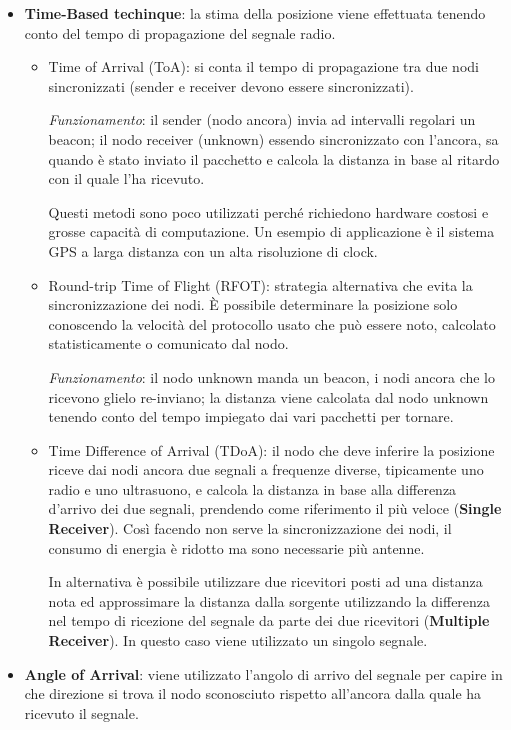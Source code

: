 \begin{itemize}
    \item \textbf{Time-Based techinque}: la stima della posizione viene effettuata tenendo conto
    del tempo di propagazione del segnale radio.
    \begin{itemize}
        \item Time of Arrival (ToA): si conta il tempo di propagazione tra due
        nodi sincronizzati (sender e receiver devono essere sincronizzati).

		\textit{Funzionamento}: il sender (nodo ancora) invia ad intervalli regolari un beacon; il nodo receiver (unknown) essendo sincronizzato con l'ancora, sa quando è stato inviato il pacchetto e calcola la distanza in base al ritardo con il quale l'ha ricevuto.

        Questi metodi sono poco utilizzati perché richiedono hardware costosi e grosse capacità
        di computazione. Un esempio di applicazione è il sistema GPS a larga distanza
        con un alta risoluzione di clock.

        \item Round-trip Time of Flight (RFOT): strategia alternativa che evita la
        sincronizzazione dei nodi. \`E possibile determinare la posizione solo conoscendo
        la velocità del protocollo usato che può essere noto, calcolato statisticamente
        o comunicato dal nodo.

        \textit{Funzionamento}: il nodo unknown manda un beacon, i nodi ancora che lo ricevono glielo re-inviano; la distanza viene calcolata dal nodo unknown tenendo conto del tempo impiegato dai vari pacchetti per tornare.

        \item Time Difference of Arrival (TDoA): il nodo che deve inferire la posizione riceve dai nodi ancora due segnali a frequenze diverse, tipicamente uno radio e uno ultrasuono, e calcola la distanza in base alla differenza d'arrivo dei due segnali, prendendo come riferimento il più veloce (\textbf{Single Receiver}).
        Così facendo non serve la sincronizzazione dei nodi, il consumo di
energia è ridotto ma sono necessarie più antenne.

        In alternativa è possibile utilizzare due ricevitori posti ad una distanza nota ed approssimare la distanza dalla sorgente utilizzando la differenza nel tempo di ricezione del segnale da parte dei due ricevitori (\textbf{Multiple Receiver}).
        In questo caso viene utilizzato un singolo segnale.
    \end{itemize}
    \item \textbf{Angle of Arrival}: viene utilizzato l'angolo di arrivo del segnale per capire in che direzione si trova il nodo sconosciuto rispetto all'ancora dalla quale ha ricevuto il segnale.


\end{itemize}
